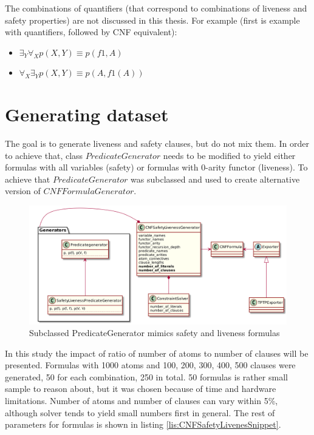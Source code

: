 The combinations of quantifiers (that correspond to combinations of liveness and safety properties) are not discussed in this thesis. For example (first is example with quantifiers, followed by CNF equivalent):
\begin{itemize}
\item $\exists_Y \forall_X p(X, Y) \equiv p(f1, A)$
\item $\forall_X \exists_Y p(X, Y) \equiv p(A,f1(A)) $
\end{itemize}

\section{Generating dataset}

The goal is to generate liveness and safety clauses, but do not mix them. In order to achieve that, class $PredicateGenerator$ needs to be modified to yield either formulas with all variables (safety) or formulas with 0-arity functor (liveness). To achieve that $PredicateGenerator$ was subclassed and used to create alternative version of $CNFFormulaGenerator$.

\begin{figure}[H]
\begin{centering}
  \includegraphics[width=\textwidth]{logic-formula-generator/fol/safety_liveness_predicate_generator.png}
  \caption{Subclassed PredicateGenerator mimics safety and liveness formulas}
\end{centering}
\end{figure}

In this study the impact of ratio of number of atoms to number of clauses will be presented.
Formulas with 1000 atoms and 100, 200, 300, 400, 500 clauses were generated, 50 for each combination, 250 in total. 50 formulas is rather small sample to reason about, but it was chosen because of time and hardware limitations. Number of atoms and number of clauses can vary within 5\%, although solver tends to yield small numbers first in general. The rest of parameters for formulas is shown in listing \ref{lis:CNFSafetyLivenesSnippet}.


